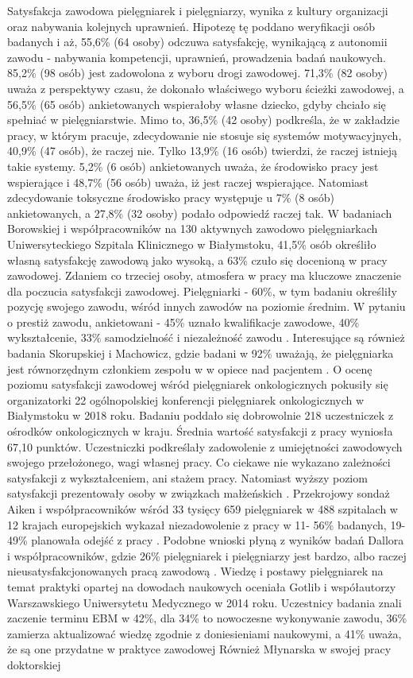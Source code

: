 \documentclass[a4paper,12pt,twoside,openright]{mwrep}
\begin{document}
Satysfakcja zawodowa pielęgniarek i pielęgniarzy, wynika z kultury organizacji oraz nabywania kolejnych uprawnień. Hipotezę tę poddano weryfikacji osób badanych i aż, 55,6\%  (64 osoby) odczuwa satysfakcję, wynikającą z autonomii zawodu - nabywania kompetencji, uprawnień, prowadzenia badań naukowych.   85,2\% (98 osób) jest zadowolona z wyboru drogi zawodowej. 71,3\% (82 osoby) uważa z perspektywy czasu, że dokonało właściwego wyboru ścieżki zawodowej, a 56,5\% (65 osób) ankietowanych wspierałoby własne dziecko, gdyby chciało się spełniać w pielęgniarstwie. Mimo to, 36,5\% (42 osoby) podkreśla, że w zakładzie pracy, w którym pracuje,   zdecydowanie nie stosuje się systemów motywacyjnych, 40,9\% (47 osób), że raczej nie. Tylko 13,9\% (16 osób) twierdzi, że raczej istnieją takie systemy. 5,2\% (6 osób) ankietowanych uważa, że środowisko pracy jest wspierające i 48,7\%  (56 osób)  uważa, iż jest raczej wspierające. Natomiast zdecydowanie toksyczne środowisko pracy występuje u 7\% (8 osób) ankietowanych, a 27,8\%  (32 osoby) podało odpowiedź raczej tak. W badaniach  Borowskiej i współpracowników na 130 aktywnych zawodowo pielęgniarkach Uniwersyteckiego Szpitala Klinicznego w Białymstoku, 41,5\% osób określiło własną satysfakcję zawodową jako wysoką, a 63\% czuło się docenioną w pracy zawodowej. Zdaniem co trzeciej osoby, atmosfera w pracy ma kluczowe znaczenie dla poczucia satysfakcji zawodowej. Pielęgniarki - 60\%, w tym badaniu określiły  pozycję swojego zawodu, wśród innych zawodów na poziomie średnim. W pytaniu o prestiż zawodu, ankietowani - 45\% uznało kwalifikacje zawodowe, 40\% wykształcenie, 33\% samodzielność i niezależność zawodu \cite{zbiorowa}. Interesujące są również badania Skorupskiej  i Machowicz, gdzie badani w 92\% uważają, że pielęgniarka jest równorzędnym członkiem zespołu w w opiece nad pacjentem \cite{skorupska}. O ocenę poziomu satysfakcji zawodowej wśród pielęgniarek onkologicznych pokusiły się organizatorki 22 ogólnopolskiej konferencji pielęgniarek onkologicznych w Białymstoku w 2018 roku. Badaniu poddało się dobrowolnie 218 uczestniczek z ośrodków onkologicznych w kraju. Średnia wartość satysfakcji z pracy wyniosła 67,10 punktów. Uczestniczki podkreślały zadowolenie z umiejętności zawodowych swojego przełożonego, wagi własnej pracy. Co ciekawe nie wykazano zależności satysfakcji z wykształceniem, ani stażem pracy. Natomiast wyższy poziom satysfakcji prezentowały osoby w związkach małżeńskich \cite{onkologiczne}. Przekrojowy sondaż Aiken i współpracowników wśród  33 tysięcy 659 pielęgniarek w 488 szpitalach w 12 krajach europejskich wykazał niezadowolenie z pracy  w 11- 56\% badanych, 19-49\% planowała odejść z pracy \cite{termedia}. Podobne wnioski płyną z wyników badań Dallora  i współpracowników, gdzie 26\% pielęgniarek i pielęgniarzy jest bardzo, albo raczej nieusatysfakcjonowanych pracą zawodową \cite{dalora}. Wiedzę i postawy pielęgniarek na temat praktyki opartej na dowodach naukowych oceniała Gotlib i współautorzy Warszawskiego Uniwersytetu Medycznego w 2014 roku. Uczestnicy badania znali zaczenie terminu EBM w 42\%, dla 34\% to nowoczesne wykonywanie zawodu, 36\% zamierza aktualizować wiedzę zgodnie z doniesieniami naukowymi, a 41\% uważa, że są one przydatne w praktyce zawodowej \cite{gotlib} Również Młynarska w swojej pracy doktorskiej  
\end{document}
